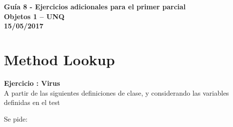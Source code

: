 \documentclass[a4paper,12pt]{article}
\newcounter{ej}
\newcounter{prte}
\newcommand{\ejercicio}[1]{\stepcounter{ej} \setcounter{prte}{0} \par \textbf{ Ejercicio \arabic{ej}: #1} \\ }
\newcommand{\tema}{Guía 8 - Ejercicios adicionales para el primer parcial}
\newcommand{\fecha}{15/05/2017}
\begin{document}

\thispagestyle{firststyle}


\begin{center}
{\Large \textbf{\tema\ \\
Objetos 1 -- UNQ \\[2mm]
\fecha}} \\
\end{center}
\bigskip

\section{Method Lookup}
\ejercicio{Virus}

A partir de las siguientes definiciones de clase, y considerando las variables definidas en el test

\medskip\noindent





Se pide:
\end{document}

